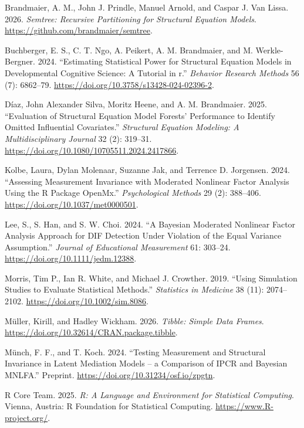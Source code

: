 \documentclass[
  man,
  floatsintext]{apa7}
\newlength{\cslhangindent}
\newenvironment{CSLReferences}[2] %
 {\begin{list}{}{%
  \setlength{\itemindent}{0pt}
  \setlength{\leftmargin}{0pt}
  \setlength{\parsep}{0pt}
  \ifodd #1
   \setlength{\leftmargin}{\cslhangindent}
   \setlength{\itemindent}{-1\cslhangindent}
  \fi
  \setlength{\itemsep}{#2\baselineskip}}}
 {\end{list}}
\begin{document}
\begin{CSLReferences}{1}{0}
Brandmaier, A. M., John J. Prindle, Manuel Arnold, and Caspar J. Van
Lissa. 2026. \emph{Semtree: Recursive Partitioning for Structural
Equation Models}. \url{https://github.com/brandmaier/semtree}.

Buchberger, E. S., C. T. Ngo, A. Peikert, A. M. Brandmaier, and M.
Werkle-Bergner. 2024. {``Estimating Statistical Power for Structural
Equation Models in Developmental Cognitive Science: A Tutorial in r.''}
\emph{Behavior Research Methods} 56 (7): 6862--79.
\url{https://doi.org/10.3758/s13428-024-02396-2}.

Díaz, John Alexander Silva, Moritz Heene, and A. M. Brandmaier. 2025.
{``Evaluation of Structural Equation Model Forests' Performance to
Identify Omitted Influential Covariates.''} \emph{Structural Equation
Modeling: A Multidisciplinary Journal} 32 (2): 319--31.
\url{https://doi.org/10.1080/10705511.2024.2417866}.

Kolbe, Laura, Dylan Molenaar, Suzanne Jak, and Terrence D. Jorgensen.
2024. {``{Assessing Measurement Invariance with Moderated Nonlinear
Factor Analysis Using the R Package OpenMx}.''} \emph{Psychological
Methods} 29 (2): 388--406. \url{https://doi.org/10.1037/met0000501}.

Lee, S., S. Han, and S. W. Choi. 2024. {``A Bayesian Moderated Nonlinear
Factor Analysis Approach for DIF Detection Under Violation of the Equal
Variance Assumption.''} \emph{Journal of Educational Measurement} 61:
303--24. \url{https://doi.org/10.1111/jedm.12388}.

Morris, Tim P., Ian R. White, and Michael J. Crowther. 2019. {``Using
Simulation Studies to Evaluate Statistical Methods.''} \emph{Statistics
in Medicine} 38 (11): 2074--2102.
\url{https://doi.org/10.1002/sim.8086}.

Müller, Kirill, and Hadley Wickham. 2026. \emph{Tibble: Simple Data
Frames}. \url{https://doi.org/10.32614/CRAN.package.tibble}.

Münch, F. F., and T. Koch. 2024. {``Testing Measurement and Structural
Invariance in Latent Mediation Models -- a Comparison of IPCR and
Bayesian MNLFA.''} Preprint.
\url{https://doi.org/10.31234/osf.io/zpgtn}.

R Core Team. 2025. \emph{R: A Language and Environment for Statistical
Computing}. Vienna, Austria: R Foundation for Statistical Computing.
\url{https://www.R-project.org/}.


\end{CSLReferences}
\end{document}
